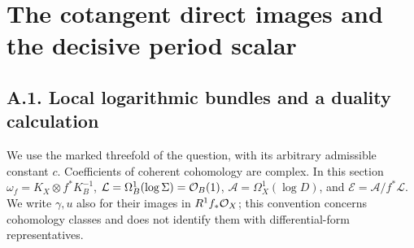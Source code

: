 \section{The cotangent direct images and the decisive period scalar}
\label{sec:partA}

\subsection{A.1. Local logarithmic bundles and a duality calculation}

We use the marked threefold of the question, with its arbitrary admissible
constant $c$.  Coefficients of coherent cohomology are complex.  In this
section $\omega_f=K_X\otimes f^*K_B^{-1}$,
$\mathcal L=\Omega_B^1(\log\Sigma)=\mathcal O_B(1)$,
$\mathcal A=\Omega_X^1(\log D)$, and
$\mathcal E=\mathcal A/f^*\mathcal L$.  We write $\gamma,u$ also for
their images in $R^1f_*\mathcal O_X$; this convention concerns cohomology
classes and does not identify them with differential-form representatives.

